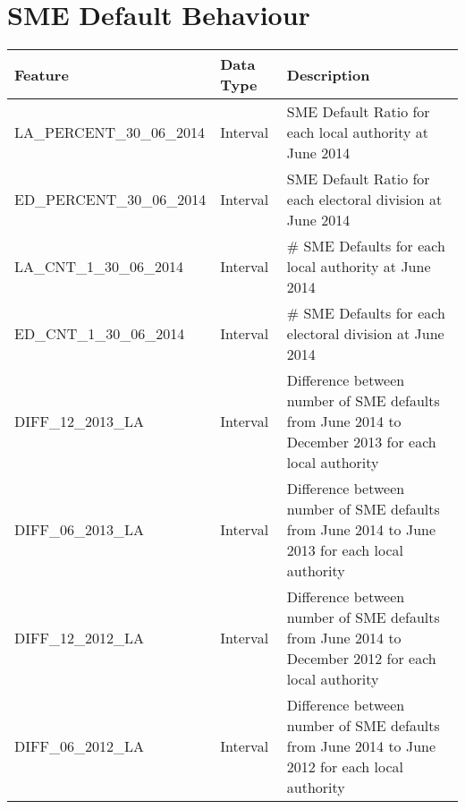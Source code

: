 
\chapter{SME Default Behaviour} %

\label{AppendixF} %


\begin{table}[H]
	\centering
	\resizebox{\textwidth}{!}
	{
		\begin{tabular}{|l|l|l|}
			\hline
			\textbf{Feature} & \textbf{Data Type} & \textbf{Description}                                                                                                                                                                                                                                                                                                                                                                                                                                                                                                                              \\ \hline
			LA\_PERCENT\_30\_06\_2014 & Interval & SME Default Ratio for each local authority at June 2014 \\ \hline
			ED\_PERCENT\_30\_06\_2014 & Interval & SME Default Ratio for each electoral division at June 2014 \\ \hline
			LA\_CNT\_1\_30\_06\_2014 & Interval & \# SME Defaults for each local authority at June 2014 \\ \hline
			ED\_CNT\_1\_30\_06\_2014 & Interval & \# SME Defaults for each electoral division at June 2014\\ \hline
			DIFF\_12\_2013\_LA & Interval & Difference between number of SME defaults from June 2014 to December 2013 for each local authority \\ \hline
			DIFF\_06\_2013\_LA & Interval & Difference between number of SME defaults from June 2014 to June 2013 for each local authority \\ \hline
			DIFF\_12\_2012\_LA & Interval & Difference between number of SME defaults from June 2014 to December 2012 for each local authority \\ \hline
			DIFF\_06\_2012\_LA & Interval & Difference between number of SME defaults from June 2014 to June 2012 for each local authority \\ \hline
			

\end{tabular}}
\end{table}
